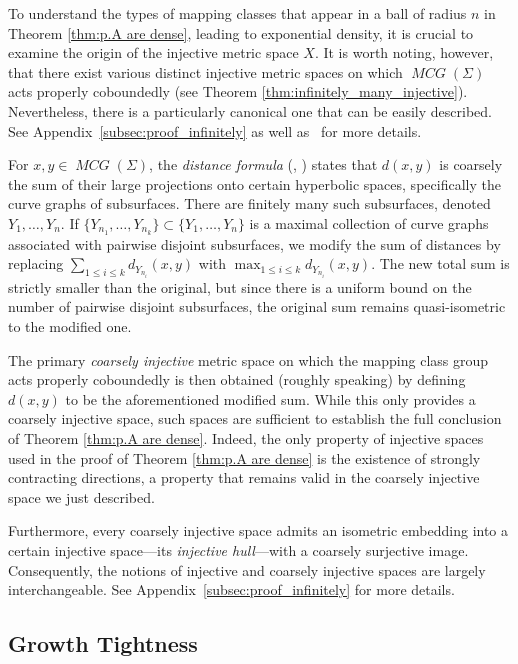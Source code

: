 \documentclass{amsart}
\numberwithin{thm}{section}
\numberwithin{figure}{section}
\theoremstyle{definition}
\theoremstyle{definition}
\theoremstyle{remark}
\numberwithin{equation}{section}
\DeclareMathOperator{\MCG}{\mathit{MCG}}
\theoremstyle{plain}
\begin{document}
To understand the types of mapping classes that appear in a ball of radius $n$ in Theorem \ref{thm:p.A are dense}, leading to exponential density, it is crucial to examine the origin of the injective metric space $X$. It is worth noting, however, that there exist various distinct injective metric spaces on which $\MCG(\Sigma)$ acts properly coboundedly (see Theorem \ref{thm:infinitely_many_injective}). Nevertheless, there is a particularly canonical one that can be easily described. See Appendix~\ref{subsec:proof_infinitely} as well as~\cite{PetytZalloum24} for more details.

For $x, y \in \MCG(\Sigma)$, the \emph{distance formula} (\cite{masurminsky:geometry:1}, \cite{masurminsky:geometry:2}) states that $d(x,y)$ is coarsely the sum of their large projections onto certain hyperbolic spaces, specifically the curve graphs of subsurfaces. There are finitely many such subsurfaces, denoted $Y_1, \dots, Y_n$. If $\{Y_{n_1}, \dots, Y_{n_k}\} \subset \{Y_1, \dots, Y_n\}$ is a maximal collection of curve graphs associated with pairwise disjoint subsurfaces, we modify the sum of distances by replacing $\sum_{1 \leq i \leq k} d_{Y_{n_i}}(x,y)$ with $\max_{1 \leq i \leq k} d_{Y_{n_i}}(x,y)$. The new total sum is strictly smaller than the original, but since there is a uniform bound on the number of pairwise disjoint subsurfaces, the original sum remains quasi-isometric to the modified one. 

The primary \emph{coarsely injective} metric space on which the mapping class group acts properly coboundedly is then obtained (roughly speaking) by defining $d(x,y)$ to be the aforementioned modified sum. While this only provides a coarsely injective space, such spaces are sufficient to establish the full conclusion of Theorem \ref{thm:p.A are dense}. Indeed, the only property of injective spaces used in the proof of Theorem \ref{thm:p.A are dense} is the existence of strongly contracting directions, a property that remains valid in the coarsely injective space we just described. 

Furthermore, every coarsely injective space admits an isometric embedding into a certain injective space—its \emph{injective hull}—with a coarsely surjective image. Consequently, the notions of injective and coarsely injective spaces are largely interchangeable. See Appendix~\ref{subsec:proof_infinitely} for more details.


\subsection{Growth Tightness} 
\end{document}
